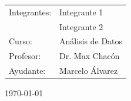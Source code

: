 \documentclass[12pt,letterpaper]{article}
\begin{document}
	\vspace*{6.25cm}
	\begin{flushright}
		\begin{tabular}[t]{l l}
			Integrantes: &Integrante 1\\
                         &Integrante 2\\
			Curso: &Análisis de Datos\\
			Profesor: &Dr. Max Chacón\\
			Ayudante: &Marcelo Álvarez

		\end{tabular}
	\end{flushright}
	\begin{center}
		\vspace{1.5cm}
		\today
	\end{center}

\newpage
\tableofcontents
\thispagestyle{empty}

\newpage
\renewcommand{\thepage}{\arabic{page}}
\setcounter{page}{1}






\clearpage
{}
\printbibliography
\end{document}
